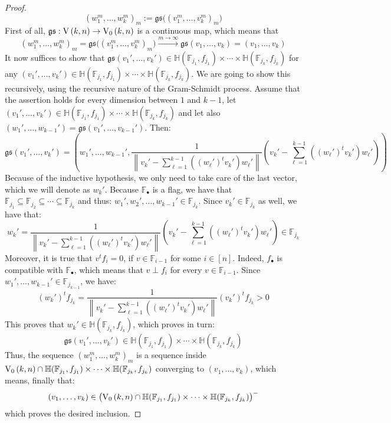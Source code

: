 \begin{proof}
\[{(w_1^m,\ldots,w_k^m)}_m:=\mathfrak{gs}\big({(v_1^m,\ldots,v_k^m)}_m\big)\]
First of all, $\mathfrak{gs}:\St{k}{n}\to\StO{k}{n}$ is a continuous map, which means that
\[{(w_1^m,\ldots,w_k^m)}_m=\mathfrak{gs}\big({(v_1^m,\ldots,v_k^m)}_m\big)\overset{m\to\infty}{\to}\mathfrak{gs}(v_1,\ldots,v_k)=(v_1,\ldots,v_k)\]
It now suffices to show that $\mathfrak{gs}(v_1',\ldots,v_k')\in\mathbb{H}(\mathbb{F}_{j_1},f_{j_1})\times\cdots\times\mathbb{H}(\mathbb{F}_{j_k},f_{j_k})$ for any $(v_1',\ldots,v_k')\in\mathbb{H}(\mathbb{F}_{j_1},f_{j_1})\times\cdots\times\mathbb{H}(\mathbb{F}_{j_k},f_{j_k})$. We are going to show this recursively, using the recursive nature of the Gram-Schmidt process. Assume that the assertion holds for every dimension between $1$ and $k-1$, let $(v_1',\ldots,v_k')\in\mathbb{H}(\mathbb{F}_{j_1},f_{j_1})\times\cdots\times\mathbb{H}(\mathbb{F}_{j_k},f_{j_k})$ and let also $(w_1',\ldots,w_{k-1}')=\mathfrak{gs}(v_1',\ldots,v_{k-1}')$. Then:
\[\mathfrak{gs}(v_1',\ldots,v_k')=\left(w_1',\ldots,w_{k-1}',\frac{1}{\left\|v_k'-\sum_{\ell=1}^{k-1}((w_{\ell}')^t v_k')w_{\ell}'\right\|}\left(v_k'-\sum_{\ell=1}^{k-1}((w_{\ell}')^tv_k')w_{\ell}'\right)\right)\]
Because of the inductive hypothesis, we only need to take care of the last vector, which we will denote as $w_k'$. Because $\mathbb{F}_{\bullet}$ is a flag, we have that $\mathbb{F}_{j_1}\subseteq\mathbb{F}_{j_2}\subseteq\cdots\subseteq\mathbb{F}_{j_k}$ and thus: $w_1',w_2',\ldots,w_{k-1}'\in\mathbb{F}_{j_k}$. Since $v_k'\in\mathbb{F}_{j_k}$ as well, we have that:
\[w_k'=\frac{1}{\left\|v_k'-\sum_{\ell=1}^{k-1}((w_{\ell}')^tv_k')w_{\ell}'\right\|}\left(v_k'-\sum_{\ell=1}^{k-1}((w_{\ell}')^t v_k')w_{\ell}'\right)\in\mathbb{F}_{j_k}\]
Moreover, it is true that $v^tf_i=0$, if $v\in\mathbb{F}_{i-1}$ for some $i\in[n]$. Indeed, $f_{\bullet}$ is compatible with $\mathbb{F}_{\bullet}$, which means that $v\perp f_i$ for every $v\in\mathbb{F}_{i-1}$. Since $w_1',\ldots,w_{k-1}'\in\mathbb{F}_{j_{k-1}}$, we have:
\[(w_k')^tf_{j_k}=\frac{1}{\left\|v_k'-\sum_{\ell=1}^{k-1}((w_{\ell}')^tv_k')w_{\ell}'\right\|}(v_k')^tf_{j_k}>0\]
This proves that $w_k'\in\mathbb{H}(\mathbb{F}_{j_k},f_{j_k})$, which proves in turn:
\[\mathfrak{gs}(v_1',\ldots,v_k')\in\mathbb{H}(\mathbb{F}_{j_1},f_{j_1})\times\cdots\times\mathbb{H}(\mathbb{F}_{j_k},f_{j_k})\]
Thus, the sequence ${(w_1^m,\ldots,w_k^m)}_m$ is a sequence inside $\StO{k}{n}\cap\mathbb{H}(\mathbb{F}_{j_1},f_{j_1})\times\cdots\times\mathbb{H}(\mathbb{F}_{j_k},f_{j_k})$ converging to $(v_1,\ldots,v_k)$, which means, finally that:
\[(v_1,\ldots,v_k)\in{\big(\StO{k}{n}\cap\mathbb{H}(\mathbb{F}_{j_1},f_{j_1})\times\cdots\times\mathbb{H}(\mathbb{F}_{j_k},f_{j_k})\big)}^-\]
which proves the desired inclusion.
\end{proof}

